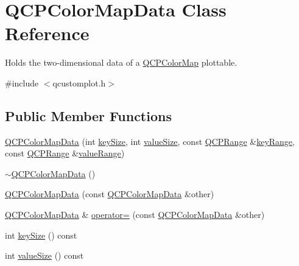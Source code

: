 \hypertarget{class_q_c_p_color_map_data}{}\section{Q\+C\+P\+Color\+Map\+Data Class Reference}
\label{class_q_c_p_color_map_data}


Holds the two-\/dimensional data of a \mbox{\hyperlink{class_q_c_p_color_map}{Q\+C\+P\+Color\+Map}} plottable.  




{\ttfamily \#include $<$qcustomplot.\+h$>$}

\subsection*{Public Member Functions}
\begin{DoxyCompactItemize}
\item 
\mbox{\hyperlink{class_q_c_p_color_map_data_aac9d8eb81e18e240d89d56c01933fd23}{Q\+C\+P\+Color\+Map\+Data}} (int \mbox{\hyperlink{class_q_c_p_color_map_data_abbda4d28de97aedce1e6e6f008a0a1f7}{key\+Size}}, int \mbox{\hyperlink{class_q_c_p_color_map_data_a8510cafea24645bbb62b5e0bfc43209f}{value\+Size}}, const \mbox{\hyperlink{class_q_c_p_range}{Q\+C\+P\+Range}} \&\mbox{\hyperlink{class_q_c_p_color_map_data_a1e43abd20a77b922b7cecfc69bf4dad7}{key\+Range}}, const \mbox{\hyperlink{class_q_c_p_range}{Q\+C\+P\+Range}} \&\mbox{\hyperlink{class_q_c_p_color_map_data_a818e4e384aa4e5fad69ac603924394d3}{value\+Range}})
\item 
\mbox{\hyperlink{class_q_c_p_color_map_data_a7ac252031d0921520d5bccb6bfa23a8b}{$\sim$\+Q\+C\+P\+Color\+Map\+Data}} ()
\item 
\mbox{\hyperlink{class_q_c_p_color_map_data_a7f2145d86473263494abb9bf1de20436}{Q\+C\+P\+Color\+Map\+Data}} (const \mbox{\hyperlink{class_q_c_p_color_map_data}{Q\+C\+P\+Color\+Map\+Data}} \&other)
\item 
\mbox{\hyperlink{class_q_c_p_color_map_data}{Q\+C\+P\+Color\+Map\+Data}} \& \mbox{\hyperlink{class_q_c_p_color_map_data_afdf4dd1b2f5714234fe84709b85c2a8d}{operator=}} (const \mbox{\hyperlink{class_q_c_p_color_map_data}{Q\+C\+P\+Color\+Map\+Data}} \&other)
\item 
int \mbox{\hyperlink{class_q_c_p_color_map_data_abbda4d28de97aedce1e6e6f008a0a1f7}{key\+Size}} () const
\item 
int \mbox{\hyperlink{class_q_c_p_color_map_data_a8510cafea24645bbb62b5e0bfc43209f}{value\+Size}} () const
\item 

\end{DoxyCompactItemize}
